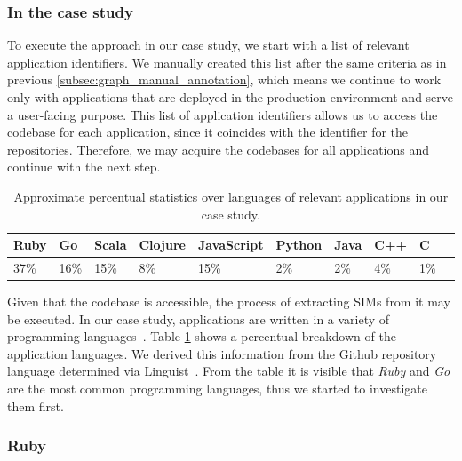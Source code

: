 \subsubsection{In the case study}

To execute the approach in our case study, we start with a list of relevant application identifiers. We manually created this list after the same criteria as in previous \autoref{subsec:graph_manual_annotation}, which means we continue to work only with applications that are deployed in the production environment and serve a user-facing purpose. This list of application identifiers allows us to access the codebase for each application, since it coincides with the identifier for the repositories. Therefore, we may acquire the codebases for all applications and continue with the next step.

\begin{table}
  \caption{Approximate percentual statistics over languages of relevant applications in our case study.}
  \label{tab:SIM_language_stats}
  \begin{tabular}{ |l|l|l|l|l|l|l|l|l|l| }
    \hline
    Ruby & Go & Scala & Clojure & JavaScript & Python & Java & C++ & C \\
    \hline
    37\% & 16\% & 15\% & 8\% & 15\% & 2\% & 2\% & 4\% & 1\%\\
    \hline
  \end{tabular}
\end{table}

Given that the codebase is accessible, the process of extracting SIMs from it may be executed. In our case study, applications are written in a variety of programming languages~\cite{BourgonPolyglotGo}. Table \ref{tab:SIM_language_stats} shows a percentual breakdown of the application languages. We derived this information from the Github repository language determined via Linguist~\cite{linguist}. From the table it is visible that \emph{Ruby} and \emph{Go} are the most common programming languages, thus we started to investigate them first.

\subsubsection{Ruby}



